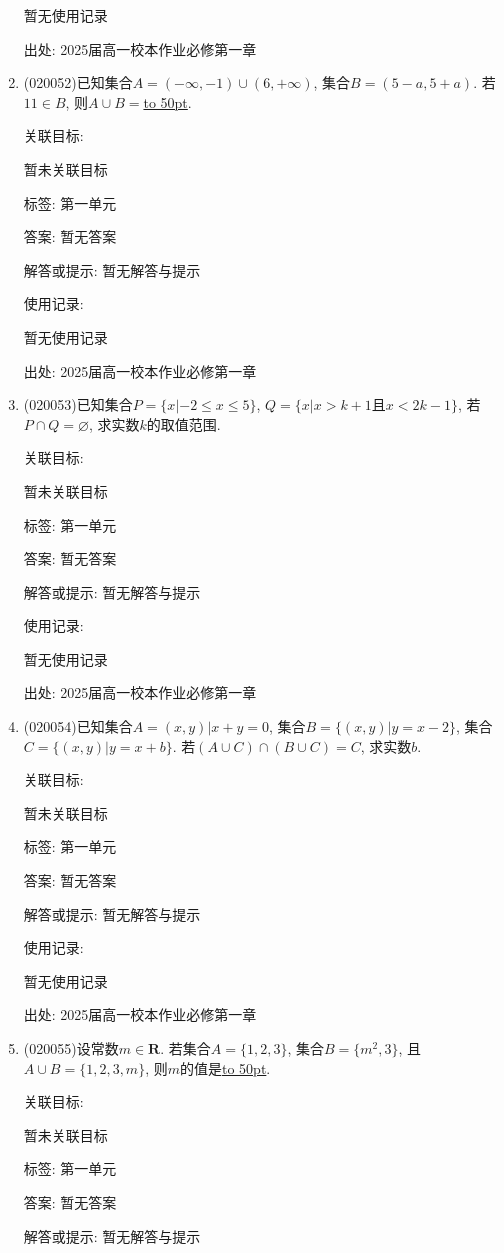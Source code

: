 \documentclass[10pt,a4paper]{article}
\newcommand{\blank}[1]{\underline{\hbox to #1pt{}}}
\begin{document}
\begin{enumerate}[1.]
暂无使用记录


出处: 2025届高一校本作业必修第一章
\item { (020052)}已知集合$A=(-\infty, -1)\cup(6, +\infty)$, 集合$B=(5-a, 5+a)$. 若$11\in B$, 则$A\cup B=$\blank{50}.


关联目标:

暂未关联目标



标签: 第一单元

答案: 暂无答案

解答或提示: 暂无解答与提示

使用记录:

暂无使用记录


出处: 2025届高一校本作业必修第一章
\item { (020053)}已知集合$P=\{ x|-2\le x\le 5\}$, $Q=\{x|x>k+1$且$x<2k-1\}$, 若$P\cap Q=\varnothing$, 求实数$k$的取值范围.


关联目标:

暂未关联目标



标签: 第一单元

答案: 暂无答案

解答或提示: 暂无解答与提示

使用记录:

暂无使用记录


出处: 2025届高一校本作业必修第一章
\item { (020054)}已知集合$A={(x, y)|x+y=0}$, 集合$B=\{(x,y)|y=x-2\}$, 集合$C=\{(x,y)|y=x+b\}$. 若$(A\cup C)\cap(B\cup C)=C$, 求实数$b$.


关联目标:

暂未关联目标



标签: 第一单元

答案: 暂无答案

解答或提示: 暂无解答与提示

使用记录:

暂无使用记录


出处: 2025届高一校本作业必修第一章
\item { (020055)}设常数$m\in \mathbf{R}$. 若集合$A=\{1,2,3\}$, 集合$B=\{m^2,3\}$, 且$A\cup B=\{1,2,3,m\}$, 则$m$的值是\blank{50}.


关联目标:

暂未关联目标



标签: 第一单元

答案: 暂无答案

解答或提示: 暂无解答与提示


\end{enumerate}
\end{document}
